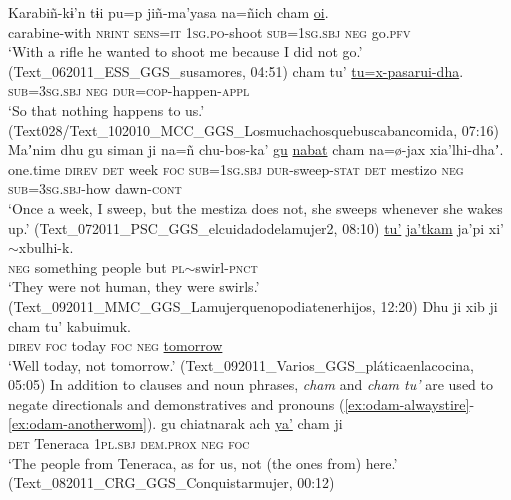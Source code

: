 \documentclass[output=paper,draft,draftmode,colorlinks,citecolor=brown]{langscibook}
\begin{document}
\ea
\label{ex:odam-karabin}
\gll Karabiñ-kɨ’n 		tɨi 		pu=p 		jiñ-ma’yasa na=ñich 		cham	\uline{oi}.\\
carabine-with 	\textsc{nrint} 	\textsc{sens=it} 	\textsc{1sg.po}-shoot \textsc{sub=1sg.sbj} 	\textsc{neg} 	go.\textsc{pfv}\\
\glt ‘With a rifle he wanted to shoot me because I did not go.’ (Text\_062011\_ESS\_GGS\_susamores, 04:51)
\z 
\ea
\label{ex:odam-happenap} 
 	{cham tu’} 	\uline{tu=x-pasarui-dha}.\\
	\textsc{sub=3sg.sbj}	\textsc{neg}		\textsc{dur=cop}-happen-\textsc{appl}\\
\glt ‘So that nothing happens to us.’ (Text028/Text\_102010\_MCC\_GGS\_Losmuchachosquebuscabancomida, 07:16)
\z 
\ea
\label{ex:odam-mestiza}
\gll Maʼnim	dhu 		gu 	siman	ji 	na=ñ chu-bos-ka’		\uline{gu}	\uline{nabat} 		cham	na=\o-jax		xia’lhi-dhaʼ.\\
one.time 	\textsc{direv} 	\textsc{det} 	week 	\textsc{foc} 	\textsc{sub=1sg.sbj} 	\textsc{dur}-sweep-\textsc{stat}	\textsc{det} 	mestizo 	\textsc{neg} 	\textsc{sub=3sg.sbj}-how 	dawn-\textsc{cont}\\
\glt ‘Once a week, I sweep, but the mestiza does not, she sweeps whenever she wakes up.’ (Text\_072011\_PSC\_GGS\_elcuidadodelamujer2, 08:10)
\z 
\ea
\label{ex:odam-human}
	\uline{tu’} 		\uline{ja’tkam}	ja’pi 	xi’$\sim$xbulhi-k.\\
\textsc{neg} 		something 	people 		but 	\textsc{pl}$\sim$swirl-\textsc{pnct}\\
\glt ‘They were not human, they were swirls.’ (Text\_092011\_MMC\_GGS\_Lamujerquenopodiatenerhijos, 12:20)
\z 
\ea
\label{ex:odam-notoday}
\gll Dhu 	ji 	xib 	ji 	{cham tu'} 	kabuimuk.\\
\textsc{direv}	\textsc{foc}	today	\textsc{foc} 	\textsc{neg}		\uline{tomorrow}\\
\glt ‘Well today, not tomorrow.’ (Text\_092011\_Varios\_GGS\_pláticaenlacocina, 05:05)
\z 
In addition to clauses and noun phrases, \emph{cham} and \emph{cham tu’} are used to negate directionals and demonstratives  and pronouns (\ref{ex:odam-alwaystire}-\ref{ex:odam-anotherwom}).
\ea
\label{ex:odam-teneraca}
\gll gu 	chiatnarak 	ach 		\uline{ya’} 	cham 	ji\\
\textsc{det} 	Teneraca 	\textsc{1pl.sbj} 	\textsc{dem.prox} 	\textsc{neg} 	\textsc{foc}\\
\glt ‘The people from Teneraca, as for us, not (the ones from) here.’ (Text\_082011\_CRG\_GGS\_Conquistarmujer, 00:12)
\end{document}
